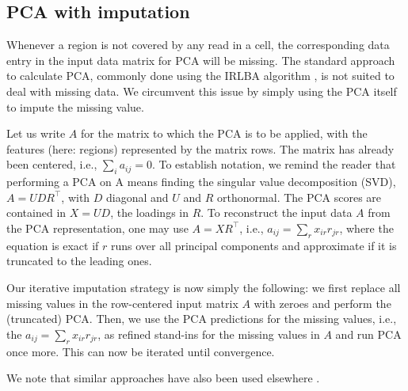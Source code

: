 \documentclass[twocolumn,10pt]{article}
\begin{document}
\subsection{PCA with imputation}

Whenever a region is not covered by any read in a cell, the corresponding data entry in the input data matrix for PCA will be missing.
The standard approach to calculate PCA, commonly done using the IRLBA algorithm \citep{Baglama2005}, is not suited to deal with missing data.
We circumvent this issue by simply using the PCA itself to impute the missing value.

Let us write $A$ for the matrix to which the PCA is to be applied, with the features (here: regions) represented by the matrix rows.
The matrix has already been centered, i.e., $\sum_i a_{ij}=0$.
To establish notation, we remind the reader that performing a PCA on A means finding the singular value decomposition (SVD), $A=UDR^\top$, with $D$ diagonal and $U$ and $R$ orthonormal.
The PCA scores are contained in $X=UD$, the loadings in $R$.
To reconstruct the input data $A$ from the PCA representation, one may use $A=XR^\top$, i.e., $a_{ij}=\sum_r x_{ir} r_{jr}$, where the equation is exact if $r$ runs over all principal components and approximate if it is truncated to the leading ones.

Our iterative imputation strategy is now simply the following: we first replace all missing values in the row-centered input matrix $A$ with zeroes and perform the (truncated) PCA.
Then, we use the PCA predictions for the missing values, i.e., the $a_{ij}=\sum_r x_{ir} r_{jr}$, as refined stand-ins for the missing values in $A$ and run PCA once more.
This can now be iterated until convergence.

We note that similar approaches have also been used elsewhere \citep{josse2012}.
\end{document}
